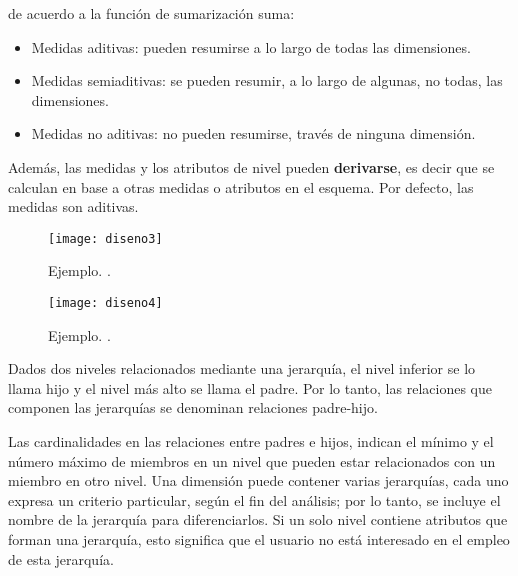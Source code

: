 \documentclass[a4paper,11pt]{article}
\begin{document}
\begin{itemize}
        de acuerdo a la función de sumarización suma:
        \begin{itemize}
          \item Medidas aditivas: pueden resumirse a lo largo de todas las dimensiones.
          \item Medidas semiaditivas: se pueden resumir, a lo largo de algunas, no todas, las dimensiones.
          \item Medidas no aditivas: no pueden resumirse, través de ninguna dimensión.
        \end{itemize}
        Además, las medidas y los atributos de nivel pueden \textbf{derivarse}, es decir que se calculan en base a otras medidas o atributos en el esquema.
        Por defecto, las medidas son aditivas.
      \end{itemize}
      
      \begin{figure}
        \begin{center}
          \texttt{[image: diseno3]}
          \caption{Ejemplo. \cite[p.~592]{VaismanZimanyi14}.}
          \label{disenoEj1}
        \end{center}
      \end{figure}
      
      \begin{figure}
        \begin{center}
          \texttt{[image: diseno4]}
          \caption{Ejemplo. \cite[p.~107]{VaismanZimanyi14}.}
          \label{disenoEj2}
        \end{center}
      \end{figure}
    
      Dados dos niveles relacionados mediante una jerarquía, el nivel inferior se lo llama hijo y el nivel más alto se llama el padre.
      Por lo tanto, las relaciones que componen las jerarquías se denominan relaciones padre-hijo.
      
      Las cardinalidades en las relaciones entre padres e hijos, indican el mínimo y el número máximo de miembros en un nivel que pueden estar relacionados
      con un miembro en otro nivel.
      Una dimensión puede contener varias jerarquías, cada uno expresa un criterio particular, según el fin del análisis; por lo tanto, se incluye el nombre
      de la jerarquía para diferenciarlos. Si un solo nivel contiene atributos que forman una jerarquía, esto significa que el usuario no está interesado
      en el empleo de esta jerarquía.
      
\end{document}

